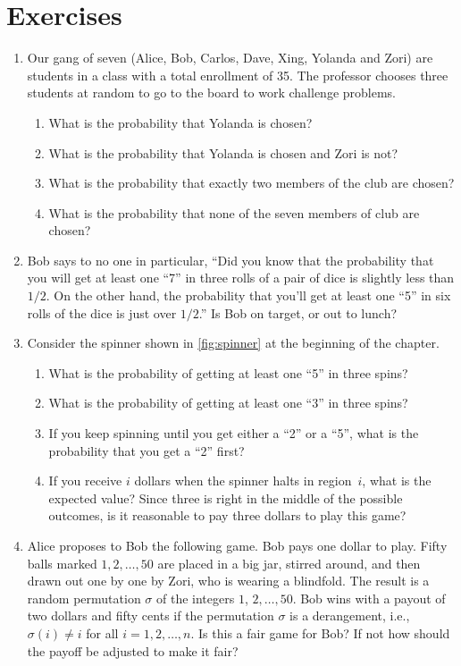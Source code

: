 \section{Exercises}\label{s:probability:exercises}
\begin{enumerate}
\item Our gang of seven (Alice, Bob, Carlos, Dave, Xing, Yolanda and Zori) are
students in a class with a total enrollment of 35.  The professor
chooses three students at random to go to the board to work
challenge problems.  
\begin{enumerate}
\item What is the probability that Yolanda is chosen?
\item What is the probability that Yolanda is chosen and Zori is not? 
\item What is the probability that exactly two members of the club are chosen?
\item What is the probability that none of the seven members of club are chosen?
\end{enumerate}
\item Bob says to no one in particular, ``Did you know that the
  probability that you will get at least one ``7'' in three rolls of a
  pair of dice is slightly less than $1/2$.  On the other hand, the
  probability that you'll get at least one ``5'' in six rolls of the
  dice is just over $1/2$.''  Is Bob on target, or out to lunch?
\item Consider the spinner shown in \autoref{fig:spinner} at the
  beginning of the chapter.
\begin{enumerate}
\item What is the probability of getting at least one ``5'' in three spins?
\item What is the probability of getting at least one ``3'' in three spins?
\item If you keep spinning until you get either a ``2'' or a ``5'', what is
the probability that you get a ``2'' first?
\item If you receive $i$ dollars when the spinner halts in region~$i$,
what is the expected value?  Since three is right in the middle of the 
possible outcomes, is it reasonable to pay three dollars to play this game?
\end{enumerate}

\item  Alice proposes to Bob the following game.  Bob pays one dollar to play.
Fifty balls marked $1,2,\dots,50$ are placed in a big jar, stirred around,
and then drawn out one by one by Zori, who is wearing a blindfold.  The result
is a random permutation $\sigma$ of the integers $1$, $2,\dots,50$.  Bob wins
with a payout of two dollars and fifty cents if the permutation $\sigma$ is 
a derangement, i.e., $\sigma(i)\neq i$ for all $i=1,2,\dots,n$. Is this a
fair game for Bob?  If not how should the payoff be adjusted to make it fair?


\end{enumerate}
